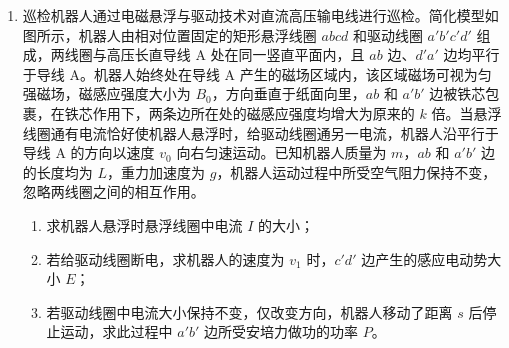 \documentclass[\gkver]{gaokaozhenti}
\begin{document}
\begin{enumerate}
\item
巡检机器人通过电磁悬浮与驱动技术对直流高压输电线进行巡检。简化模型如图所示，机器人由相对位置固定的矩形悬浮线圈 $abcd$ 和驱动线圈 $a'b'c'd'$ 组成，两线圈与高压长直导线 A 处在同一竖直平面内，且 $ab$ 边、$d'a'$ 边均平行于导线 A。机器人始终处在导线 A 产生的磁场区域内，该区域磁场可视为匀强磁场，磁感应强度大小为 $B_{0}$，方向垂直于纸面向里，$ab$ 和 $a'b'$ 边被铁芯包裹，在铁芯作用下，两条边所在处的磁感应强度均增大为原来的 $k$ 倍。当悬浮线圈通有电流恰好使机器人悬浮时，给驱动线圈通另一电流，机器人沿平行于导线 A 的方向以速度 $v_{0}$ 向右匀速运动。已知机器人质量为 $m$，$ab$ 和 $a'b'$ 边的长度均为 $L$，重力加速度为 $g$，机器人运动过程中所受空气阻力保持不变，忽略两线圈之间的相互作用。
\begin{enumerate}
	\item
	求机器人悬浮时悬浮线圈中电流 $I$ 的大小；
	\item
	若给驱动线圈断电，求机器人的速度为 $v_{1}$ 时，$c'd'$ 边产生的感应电动势大小 $E$；
	\item
	若驱动线圈中电流大小保持不变，仅改变方向，机器人移动了距离 $s$ 后停止运动，求此过程中 $a'b'$ 边所受安培力做功的功率 $P$。
\end{enumerate}
\onepicture[align=right, w=8.60cm]{}


\end{enumerate}
\end{document}

